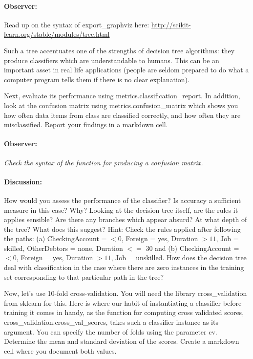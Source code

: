 \documentclass{article}
\begin{document}
\paragraph{Observer:} Read up on the syntax of export\_graphviz here: \url{http://scikit-learn.org/stable/modules/tree.html}


Such a tree accentuates one of the strengths of decision tree algorithms: they produce classifiers which are understandable to humans. This can be an important asset in real life applications (people are seldom prepared to do what a computer program tells them if there is no clear explanation). 

Next, evaluate its performance using metrics.classification\_report. In addition, look at the confusion matrix using metrics.confusion\_matrix which shows you how often data items from class are classified correctly, and how often they are misclassified. Report your findings in a markdown cell. 

\paragraph{Observer:} \emph{Check the syntax of the function for producing a confusion matrix.}

\paragraph{Discussion:} How would you assess the performance of the classifier? Is accuracy a sufficient measure in this case? Why? 
Looking at the decision tree itself, are the rules it applies sensible? Are there any branches which appear absurd? At what depth of the tree? What does this suggest? 
Hint: Check the rules applied after following the paths: (a) CheckingAccount = $<0$, Foreign = yes, Duration $>11$, Job = skilled, OtherDebtors = none, Duration $<=$ 30 and (b) CheckingAccount = $<0$, Foreign = yes, Duration $>11$, Job = unskilled. How does the decision tree deal with classification in the case where there are zero instances in the training set corresponding to that particular path in the tree?


Now, let's use 10-fold cross-validation. You will need the library cross\_validation from sklearn for this. Here is where our habit of instantiating a classifier before training it comes in handy, as the function for computing cross validated scores, cross\_validation.cross\_val\_scores, takes such a classifier instance as its argument. You can specify the number of folds using the parameter cv. Determine the mean and standard deviation of the scores. Create a markdown cell where you document both values. 
\end{document}
